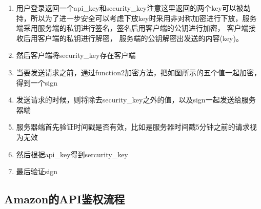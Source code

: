 \documentclass{book}
\begin{document}
\begin{enumerate}
	\setcounter{enumi}{0}
    \item{用户登录返回一个api\_key和security\_key}注意这里返回的两个key可以被劫持，所以为了进一步安全可以考虑下放key时采用非对称加密进行下放，服务端采用服务端的私钥进行签名，签名后用客户端的公钥进行加密，
客户端接收后用客户端的私钥进行解密，
服务端的公钥解密出发送的内容(key)。
    \item{然后客户端将security\_key存在客户端}
    \item{当要发送请求之前，通过function2加密方法，把如图所示的五个值一起加密，得到一个sign}
    \item{发送请求的时候，则将除去security\_key之外的值，以及sign一起发送给服务器端}
    \item{服务器端首先验证时间戳是否有效，比如是服务器时间戳5分钟之前的请求视为无效}
    \item{然后根据api\_key得到sercurity\_key}
    \item{最后验证sign}
\end{enumerate}

\subsection{Amazon的API鉴权流程}
\end{document}
